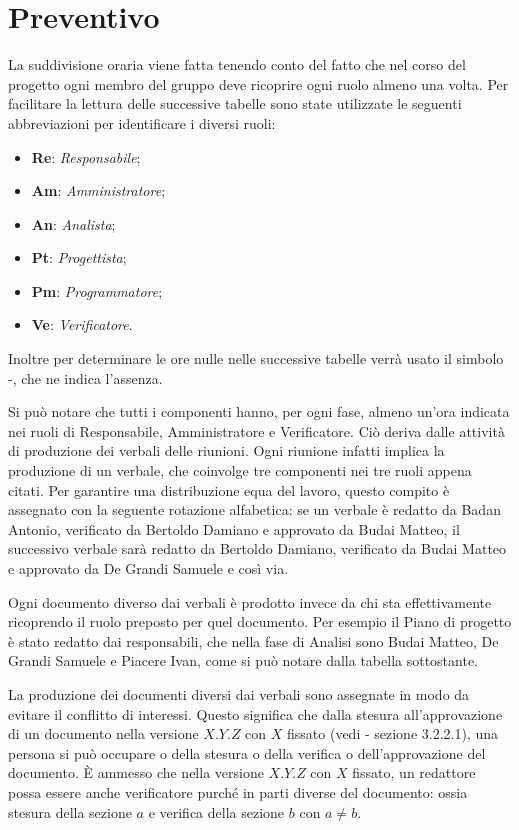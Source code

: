 \section{Preventivo}
La suddivisione oraria viene fatta tenendo conto del fatto che nel corso del progetto ogni  membro del gruppo deve ricoprire ogni ruolo almeno una volta.
Per facilitare la lettura delle successive tabelle sono state utilizzate le seguenti abbreviazioni per identificare i diversi ruoli:
\begin{itemize}
	\item \textbf{Re}: \textit{Responsabile};
	\item \textbf{Am}: \textit{Amministratore};
	\item \textbf{An}: \textit{Analista};
	\item \textbf{Pt}: \textit{Progettista};
	\item \textbf{Pm}: \textit{Programmatore};
	\item \textbf{Ve}: \textit{Verificatore}.
\end{itemize}
Inoltre per determinare le ore nulle nelle successive tabelle verrà usato il simbolo -, che ne indica l'assenza.

Si può notare che tutti i componenti hanno, per ogni fase, almeno un'ora indicata nei ruoli di Responsabile, Amministratore e Verificatore. Ciò deriva dalle attività di produzione dei verbali delle riunioni. Ogni riunione infatti implica la produzione di un verbale, che coinvolge tre componenti nei tre ruoli appena citati. Per garantire una distribuzione equa del lavoro, questo compito è assegnato con la seguente rotazione alfabetica: se un verbale è redatto da Badan Antonio, verificato da Bertoldo Damiano e approvato da Budai Matteo, il successivo verbale sarà redatto da Bertoldo Damiano, verificato da Budai Matteo e approvato da De Grandi Samuele e così via.

Ogni documento diverso dai verbali è prodotto invece da chi sta effettivamente ricoprendo il ruolo preposto per quel documento. Per esempio il Piano di progetto è stato redatto dai responsabili, che nella fase di Analisi sono Budai Matteo, De Grandi Samuele e Piacere Ivan, come si può notare dalla tabella sottostante. 

La produzione dei documenti diversi dai verbali sono assegnate in modo da evitare il conflitto di interessi. Questo significa che dalla stesura all'approvazione di un documento nella versione $X.Y.Z$ con $X$ fissato (vedi  - sezione 3.2.2.1), una persona si può occupare o della stesura o della verifica o dell'approvazione del documento. È ammesso che nella versione $X.Y.Z$ con $X$ fissato, un redattore possa essere anche verificatore purché in parti diverse del documento: ossia stesura della sezione $a$ e verifica della sezione $b$ con $a \neq b$. 

